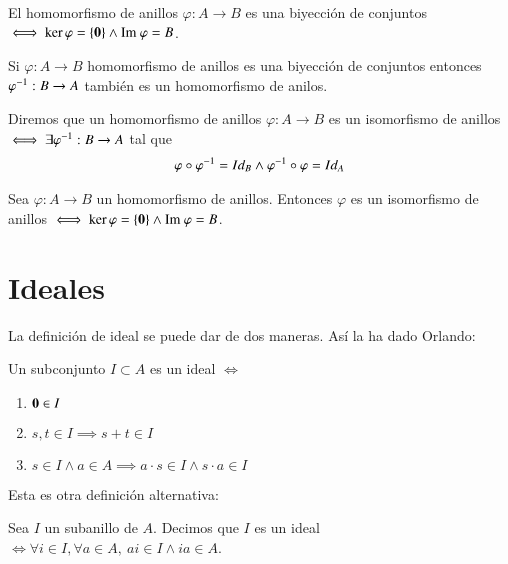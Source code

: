 \begin{pro}
	El homomorfismo de anillos $\varphi: A \to B$ es una biyección de conjuntos $\iff \ker \varphi = \{\mathbf{0}\} \land \text{Im } \varphi = B$.
\end{pro}

\begin{obs}
	Si $\varphi:A \to B$ homomorfismo de anillos es una biyección de conjuntos entonces $\varphi^{-1}:B \to A$ también es un homomorfismo de anilos.
\end{obs}

\begin{dfn}
	Diremos que un homomorfismo de anillos $\varphi:A \to B$ es un isomorfismo de anillos $\iff \exists \varphi^{-1} : B \to A$ tal que
	\begin{align*}
	\varphi \circ \varphi^{-1} = Id_B \land \varphi^{-1} \circ \varphi = Id_A
	\end{align*}
\end{dfn}

\begin{pro}
	Sea $\varphi:A \to B$ un homomorfismo de anillos. Entonces $\varphi$ es un isomorfismo de anillos $\iff \ker \varphi = \{\mathbf{0}\} \land \text{Im } \varphi = B$.
\end{pro}

\section{Ideales}

La definición de ideal se puede dar de dos maneras. Así la ha dado Orlando:

\begin{dfn}[Ideal]
	Un subconjunto $I \subset A$ es un ideal $\iff$
	\begin{enumerate}
		\item $\mathbf{0} \in I$
		\item $s,t \in I \implies s+t \in I$
		\item $s \in I \land a \in A \implies a \cdot s \in I \land s \cdot a \in I$
	\end{enumerate}
\end{dfn}

Esta es otra definición alternativa:

\begin{dfn}
	Sea $I$ un subanillo de $A$. Decimos que $I$ es un ideal $\iff \forall i \in I, \forall a \in A,\ ai \in I \land ia \in A$.
\end{dfn}

